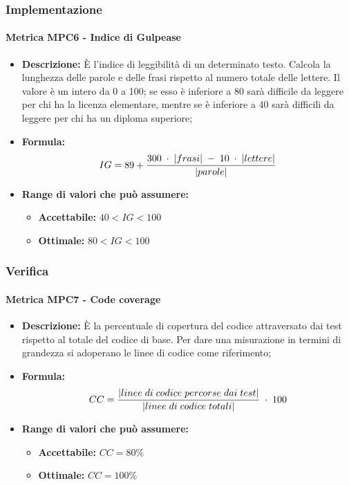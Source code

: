 \subsubsection{Implementazione}
    \paragraph{Metrica MPC6 - Indice di Gulpease}
    \begin{itemize}
        \item \textbf{Descrizione:} È l'indice di leggibilità di un determinato testo. Calcola la lunghezza delle parole e delle frasi rispetto al numero totale delle lettere. Il valore è un intero da 0 a 100; se esso è inferiore a 80 sarà difficile da leggere per chi ha la licenza elementare, mentre se è inferiore a 40 sarà difficili da leggere per chi ha un diploma superiore;
        \item \textbf{Formula:} $$IG = 89 + {{300 \; \cdot \; |frasi| \; - \; 10 \; \cdot \; |lettere|}\over |parole|}$$
        \item \textbf{Range di valori che può assumere:}
        \begin{itemize}
            \item \textbf{Accettabile:} $40 < IG < 100$
            \item \textbf{Ottimale:} $80 < IG < 100$
        \end{itemize}
    \end{itemize}

\subsubsection{Verifica}
    \paragraph{Metrica MPC7 - Code coverage}
    \begin{itemize}
        \item \textbf{Descrizione:} È la percentuale di copertura del codice attraversato dai test rispetto al totale del codice di base. Per dare una misurazione in termini di grandezza si adoperano le linee di codice come riferimento;
        \item \textbf{Formula:} $$CC = {|linee \; di \; codice \; percorse \; dai  \; test| \over |linee \; di \; codice \; totali|} \; \cdot \; 100$$
        \item \textbf{Range di valori che può assumere:}
        \begin{itemize}
            \item \textbf{Accettabile:} $CC = 80\%$
            \item \textbf{Ottimale:} $CC = 100\%$
        \end{itemize}
    \end{itemize}

